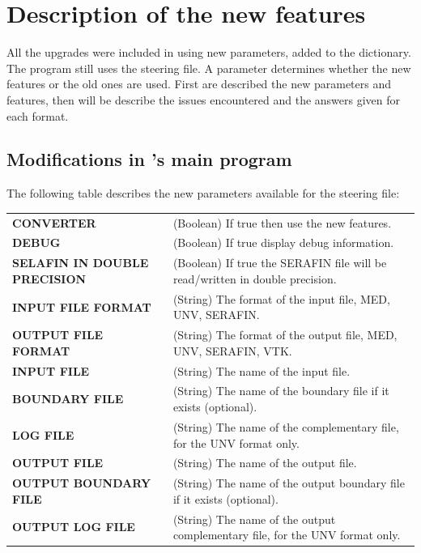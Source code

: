 \section{\label{upgrades}Description of the new features}

All the upgrades were included in \stbtel using new parameters, added to the
dictionary. The program still uses the steering file. A parameter determines
whether the new features or the old ones are used.  First are described the new
parameters and features, then will be describe the issues encountered and the
answers given for each format.

\subsection{Modifications in \stbtel's main program}

The following table describes the new parameters available for the steering
file:\\

\begin{tabular}{p{140pt}@{ : }p{200pt}}
\textbf{CONVERTER} & (Boolean) If true then use the new features.\\
\textbf{DEBUG} & (Boolean) If true display debug information.\\
\textbf{SELAFIN IN DOUBLE PRECISION} & (Boolean) If true the SERAFIN file will be read/written in double precision.\\
\textbf{INPUT FILE FORMAT} & (String) The format of the input file, MED, UNV, SERAFIN.\\
\textbf{OUTPUT FILE FORMAT} & (String) The format of the output file, MED, UNV, SERAFIN, VTK.\\
\textbf{INPUT FILE} & (String) The name of the input file.\\
\textbf{BOUNDARY FILE} & (String) The name of the boundary file if it exists (optional).\\
\textbf{LOG FILE} & (String) The name of the complementary file, for the UNV format only.\\
\textbf{OUTPUT FILE} & (String) The name of the output file.\\
\textbf{OUTPUT BOUNDARY FILE} & (String) The name of the output boundary file if it exists (optional).\\
\textbf{OUTPUT LOG FILE} & (String) The name of the output complementary file, for the UNV format only.\\
\end{tabular}

